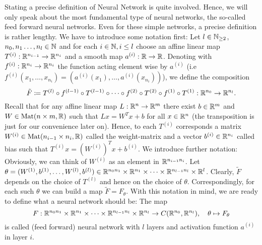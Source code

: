 Stating a precise definition of \glqq{}Neural Network\grqq{} is quite involved. 
Hence, we will only speak about the most fundamental type of neural networks, the so-called feed forward neural networks. 
Even for these simple networks, a precise definition is rather lengthy. We have to introduce some notation first:
Let $l\in\mathbb{N}_{\geq2}$, $n_0,n_1\dots,n_l\in\mathbb{N}$ and for each $i\in\mathbb{N}, i\leq l$ 
choose an affine linear map $T^{(i)}:\mathbb{R}^{n_{i-1}}\to\mathbb{R}^{n_i}$ and a smooth map $a^{(i)}:\mathbb{R}\to\mathbb{R}$.
Denoting with $f^{(i)}:\mathbb{R}^{n_i}\to\mathbb{R}^{n_i}$ the function acting element wise by $a^{(i)}$ (i.e $f^{(i)}(x_1, \dots, x_{n_i})=(a^{(i)}(x_1),\dots, a^{(i)}(x_{n_i}))$), 
we define the composition 
\begin{equation*} 
\tilde{F}\coloneq T^{(l)}\circ f^{(l-1)}\circ T^{(l-1)}\circ\dots\circ f^{(2)}\circ T^{(2)}\circ f^{(1)}\circ T^{(1)}:\mathbb{R}^{n_0}\to\mathbb{R}^{n_l}.
\end{equation*}
Recall that for any affine linear map $L:\mathbb{R}^n\to\mathbb{R}^m$ there exist $b\in\mathbb{R}^m$ and $W\in \text{Mat}(n\times m,\mathbb{R})$ such that 
$Lx=W^Tx+b$ for all $x\in\mathbb{R}^n$ (the transposition is just for our convenience later on). Hence, to each $T^{(i)}$ corresponds a matrix $W^{(i)}\in\text{Mat}(n_{i-1}\times n_i,\mathbb{R})$ called the weight-matrix and a vector
$b^{(i)}\in\mathbb{R}^{n_i}$ called bias such that $T^{(i)}x=\left(W^{(i)}\right)^Tx + b^{(i)}$.
We introduce further notation: Obviously, we can think of $W^{(i)}$ as an element in $\mathbb{R}^{n_{i-1}n_i}$. 
Let $\theta=(W^{(1)},b^{(1)},\dots,W^{(l)},b^{(l)})\in\mathbb{R}^{n_0n_1}\times\mathbb{R}^{n_1}\times\dots\times\mathbb{R}^{n_{l-1}n_l}\times\mathbb{R}^{l}$. 
Clearly, $\tilde{F}$ depends on the choice of $T^{(l)}$ and hence on the choice of $\theta$. 
Correspondingly, for each such $\theta$ we can build a map $\tilde{F}=F_\theta$.
With this notation in mind, we are ready to define what a neural network should be: The map
\begin{equation*}
    F:\mathbb{R}^{n_0n_1}\times\mathbb{R}^{n_1}\times\dots\times\mathbb{R}^{n_{l-1}n_l}\times\mathbb{R}^{n_l}\to C(\mathbb{R}^{n_0},\mathbb{R}^{n_l}), \quad\theta\mapsto F_\theta
\end{equation*}
is called (feed forward) neural network with $l$ layers and activation function $a^{(i)}$ in layer $i$.

